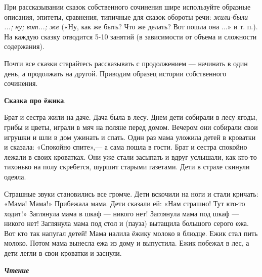\documentclass[a5paper]{book}
\renewcommand{\emph}[1]{\textit{#1}}
\begin{document}
При рассказывании сказок собственного сочинения шире используйте
образные описания, эпитеты, сравнения, типичные для сказок обороты речи:
\emph{жили-были ...; ну; вот...; же} («Ну, как же быть? Что же делать?
Вот пошла она ...» и т. п.). На каждую сказку отводится 5-10 занятий (в
зависимости от объема и сложности содержания).

Почти все сказки старайтесь рассказывать с продолжением --- начинать в
один день, а продолжать на другой. Приводим образец истории собственного
сочинения.

\textbf{Сказка про ёжика}.

Брат и сестра жили на даче. Дача была в лесу. Днем дети собирали в лесу
ягоды, грибы и цветы, играли в мяч на поляне перед домом. Вечером они
собирали свои игрушки и шли в дом ужинать и спать. Один раз мама уложила
детей в кроватки и сказала: «Спокойно спите»,--- а сама пошла в гости.
Брат и сестра спокойно лежали в своих кроватках. Они уже стали засыпать
и вдруг услышали, как кто-то тихонько на полу скребется, шуршит старыми
газетами. Дети в страхе скинули одеяла.

Страшные звуки становились все громче. Дети вскочили на ноги и стали
кричать: «Мама! Мама!» Прибежала мама. Дети сказали ей: «Нам страшно!
Тут кто-то ходит!» Заглянула мама в шкаф --- никого нет! Заглянула мама
под шкаф --- никого нет! Заглянула мама под стол и (пауза) вытащила
большого серого ежа. Вот кто так напугал детей! Мама налила ёжику молоко
в блюдце. Ежик стал пить молоко. Потом мама вынесла ежа из дому и
выпустила. Ежик побежал в лес, а дети легли в свои кроватки и заснули.

\emph{\textbf{Чтение}}
\end{document}
